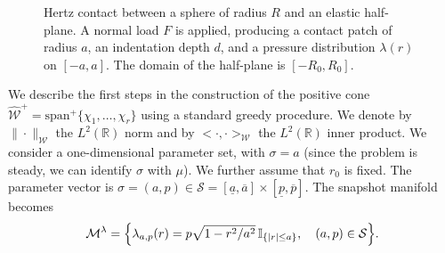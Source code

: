 \begin{figure}[h]
\caption{Hertz contact between a sphere of radius $R$ and an elastic
half-plane. A normal load $F$ is applied, producing a contact patch
of radius $a$, an indentation depth $d$, and a pressure distribution
$\lambda(r)$ on $[-a,a]$.
The domain of the half-plane is $[-R_0, R_0]$.}
\label{fig:hertz_contact}
\end{figure}
We describe the first steps in the construction of the positive cone $\mathcal{\hat{W}}^{+}=\text{span}^{+}\{\chi_1, \ldots, \chi_r\}$ using a standard greedy procedure. 
We denote by $\|\cdot \|_{\mathcal{W}}$ the $L^2(\mathbb{R})$ norm and by $<\cdot, \cdot>_{\mathcal{W}}$ the $L^2(\mathbb{R})$ inner product.
We consider a one-dimensional parameter set, with $\sigma=a$ (since the problem is steady, we can identify $\sigma$ with $\mu$). We further assume that $r_0$ is fixed. The parameter vector is $\sigma=(a,p)\in\mathcal{S}=[\underline{a},\overline{a}]\times[\underline{p},\overline{p}]$. The snapshot manifold becomes \[\mathcal{M}^{\lambda}= \Bigl\{\lambda_{a,p}(r)  = p\sqrt{1-r^2/a^2}\,\mathbb{I}_{\{|r|\leq a\}},\quad (a,p)\in\mathcal{S}\Bigr\}.\]
